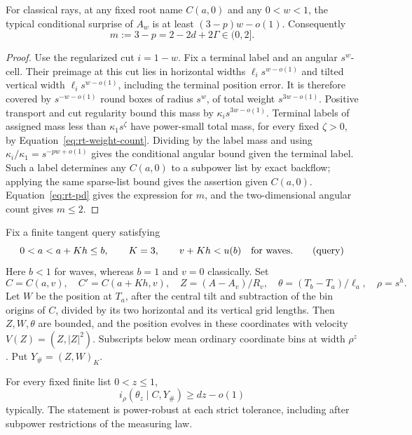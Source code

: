 \begin{lemma}\label{lem:rt-memory}
For classical rays, at any fixed root name $C(a,0)$ and any
$0<w<1$, the typical conditional surprise of $A_w$ is at least
$(3-p)w-o(1)$.  Consequently
\begin{equation}\label{eq:rt-classical-m}
 m:=3-p=2-2d+2\Gamma\in(0,2].
\end{equation}
\end{lemma}

\begin{proof}
Use the regularized cut $i=1-w$.  Fix a terminal label and an
angular $s^w$-cell.  Their preimage at this cut lies in horizontal
widths $\ell_i s^{w-o(1)}$ and tilted vertical width
$\ell_i s^{w-o(1)}$, including the terminal position error.
It is therefore covered by $s^{-w-o(1)}$ round boxes of radius
$s^w$, of total weight $s^{3w-o(1)}$.
Positive transport and cut regularity bound this mass by
$\kappa_i s^{3w-o(1)}$.  Terminal labels of assigned mass less
than $\kappa_1s^\zeta$ have power-small total mass, for every
fixed $\zeta>0$, by Equation~\eqref{eq:rt-weight-count}.
Dividing by the label mass and using
$\kappa_i/\kappa_1=s^{-pw+o(1)}$ gives the conditional angular
bound given the terminal label.  Such a label determines any
$C(a,0)$ to a subpower list by exact backflow; applying the same
sparse-list bound gives the assertion given $C(a,0)$.
Equation~\eqref{eq:rt-pd} gives the expression for $m$, and the
two-dimensional angular count gives $m\le2$.
\end{proof}

Fix a finite tangent query satisfying
\begin{equation}
 0<a<a+Kh\le b,\qquad K=3,\qquad
 v+Kh<u(b)\quad\hbox{for waves}.
 \tag{query}\label{eq:query}
\end{equation}
Here $b<1$ for waves, whereas $b=1$ and $v=0$ classically.
Set
\[
 C=C(a,v),\quad C'=C(a+Kh,v),\quad
 Z=(A-A_v)/R_v,\quad
 \theta=(T_b-T_a)/\ell_a,\quad \rho=s^h.
\]
Let $W$ be the position at $T_a$, after the central tilt and
subtraction of the bin origins of $C$, divided by its two horizontal
and its vertical grid lengths.  Then $Z,W,\theta$ are bounded,
and the position evolves in these coordinates with velocity
$V(Z)=(Z,|Z|^2)$.  Subscripts below mean ordinary coordinate bins
at width $\rho^z$.  Put $Y_\#=(Z,W)_K$.

\begin{lemma}\label{lem:rt-time}
For every fixed finite list $0<z\le1$,
\begin{equation}\label{eq:rt-time-score}
 i_\rho(\theta_z\mid C,Y_\#)\ge dz-o(1)
\end{equation}
typically.  The statement is power-robust at each strict tolerance,
including after subpower restrictions of the measuring law.
\end{lemma}

